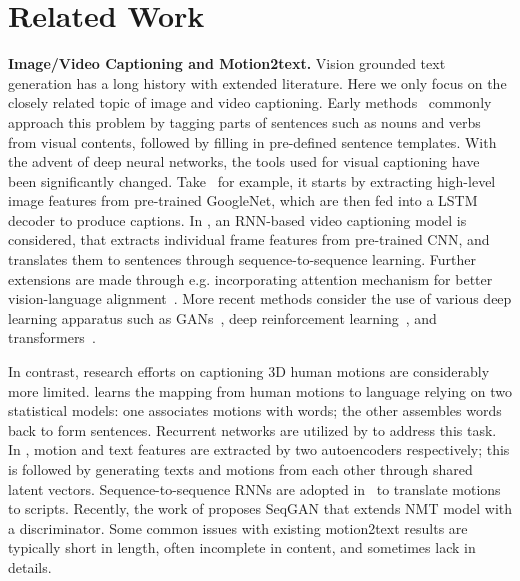 \documentclass[runningheads]{llncs}
\newcommand{\beforesection}{\vspace{-2mm}}
\newcommand{\aftersection}{\vspace{-2mm}}
\begin{document}
\beforesection
\section{Related Work}
\aftersection

\noindent\textbf{Image/Video Captioning and Motion2text.}
Vision grounded text generation has a long history with extended literature. Here we only focus on the closely related topic of image and video captioning. Early methods~\cite{kulkarni2013babytalk,kojima2002natural} commonly approach this problem by tagging parts of sentences such as nouns and verbs from visual contents, followed by filling in pre-defined sentence templates. With the advent of deep neural networks, the tools used for visual captioning have been significantly changed. Take~\cite{vinyals2015show} for example, it starts by extracting high-level image features from pre-trained GoogleNet, which are then fed into a LSTM decoder to produce captions. 
In \cite{venugopalan2015sequence}, an RNN-based video captioning model is considered, that extracts individual frame features from pre-trained CNN, and translates them to sentences through sequence-to-sequence learning. Further extensions are made through e.g. incorporating attention mechanism for better vision-language alignment~\cite{xu2015show,wang2016temporal}. More recent methods consider the use of various deep learning apparatus such as GANs~\cite{guo2019mscap,park2019adversarial}, deep reinforcement learning~\cite{gao2019self,qin2019look}, and transformers~\cite{dubey2021label,ging2020coot}. 

In contrast, research efforts on captioning 3D human motions are considerably more limited. \cite{takano2015statistical} learns the mapping from human motions to language relying on two statistical models: one associates motions with words; the other assembles words back to form sentences. Recurrent networks are utilized by \cite{yamada2018paired,plappert2018learning} to address this task. In \cite{yamada2018paired}, motion and text features are extracted by two autoencoders respectively; this is followed by generating texts and motions from each other through shared latent vectors. Sequence-to-sequence RNNs are adopted in~\cite{plappert2018learning} to translate motions to scripts. Recently, the work of \cite{goutsu2021linguistic} proposes SeqGAN that extends NMT model with a discriminator. Some common issues with existing motion2text results are typically short in length, often incomplete in content, and sometimes lack in details. 
\end{document}
